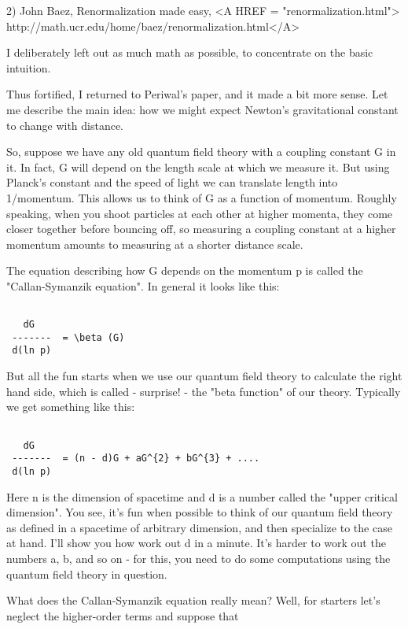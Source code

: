 2) John Baez, Renormalization made easy, <A HREF = "renormalization.html">
http://math.ucr.edu/home/baez/renormalization.html</A>

I deliberately left out as much math as possible, to concentrate 
on the basic intuition.

Thus fortified, I returned to Periwal's paper, and it made a bit 
more sense.  Let me describe the main idea: how we might expect 
Newton's gravitational constant to change with distance.  

So, suppose we have any old quantum field theory with a coupling constant
G in it.  In fact, G will depend on the length scale at which we
measure it.  But using Planck's constant and the speed of light we
can translate length into 1/momentum.  This allows us to think of G
as a function of momentum.   Roughly speaking, when you shoot particles 
at each other at higher momenta, they come closer together before 
bouncing off, so measuring a coupling constant at a higher momentum 
amounts to measuring at a shorter distance scale.  

The equation describing how G depends on the momentum p is called 
the "Callan-Symanzik equation".  In general it looks like this:


\begin{verbatim}

   dG
 -------  = \beta (G)
 d(ln p)
\end{verbatim}
    
But all the fun starts when we use our quantum field theory to calculate 
the right hand side, which is called - surprise! - the "beta function" 
of our theory.   Typically we get something like this:


\begin{verbatim}

   dG 
 -------  = (n - d)G + aG^{2} + bG^{3} + ....
 d(ln p)
\end{verbatim}
    
Here n is the dimension of spacetime and d is a number called the
"upper critical dimension".  You see, it's fun when possible to think
of our quantum field theory as defined in a spacetime of arbitrary
dimension, and then specialize to the case at hand.  I'll show you 
how work out d in a minute.  It's harder to work out the numbers 
a, b, and so on - for this, you need to do some computations using the 
quantum field theory in question.

What does the Callan-Symanzik equation really mean?  Well, for starters 
let's neglect the higher-order terms and suppose that


